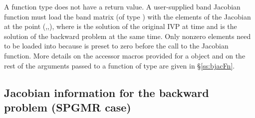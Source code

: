 {
  A  function type does not have a return value.                        
}
{
  A user-supplied band Jacobian function must load the band matrix 
  (of type ) with the elements of the Jacobian at the
  point (,,), where  is the solution
  of the original IVP at time  and  is the solution of the
  backward problem at the same time.  
  Only nonzero elements need to be loaded into
   because  is preset to zero before the call to the
  Jacobian function. More details on the accessor macros provided for
  a  object and on the rest of the arguments passed to a function
  of type  are given in \S\ref{ss:bjacFn}.
}

\subsection{Jacobian information for the backward problem (SPGMR case)}

